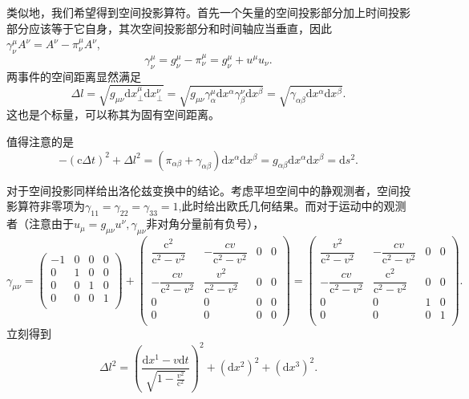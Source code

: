 \documentclass[11pt, a4paper, oneside, onecolumn]{ctexart}
\numberwithin{equation}{subsection}
\begin{document}
类似地，我们希望得到空间投影算符。首先一个矢量的空间投影部分加上时间投影部分应该等于它自身，其次空间投影部分和时间轴应当垂直，因此$\gamma^{\mu}_{\nu}A^{\nu}=A^{\nu}-\pi_{\nu}^{\mu}A^{\nu}$,
\begin{equation}
\gamma^{\mu}_{\nu}=g^{\mu}_{\nu}-\pi^{\mu}_{\nu}=g_{\nu}^{\mu}+u^{\mu}u_{\nu}.
\end{equation}
两事件的空间距离显然满足
\begin{equation}
\Delta{}l=\sqrt{g_{\mu\nu}\mathrm{d}x^{\mu}_{\bot}\mathrm{d}x^{\nu}_{\bot}}=\sqrt{g_{\mu\nu}\gamma^{\mu}_{\alpha}\mathrm{d}x^{\alpha}\gamma^{\nu}_{\beta}\mathrm{d}x^{\beta}}=\sqrt{\gamma_{\alpha\beta}\mathrm{d}x^{\alpha}\mathrm{d}x^{\beta}}.\label{2.1.11}
\end{equation}
这也是个标量，可以称其为固有空间距离。

值得注意的是
\begin{equation}
-\left(\mathrm{c}\Delta{}t\right)^{2}+\Delta{}l^{2}=\left(\pi_{\alpha\beta}+\gamma_{\alpha\beta}\right)\mathrm{d}x^{\alpha}\mathrm{d}x^{\beta}=g_{\alpha\beta}\mathrm{d}x^{\alpha}\mathrm{d}x^{\beta}=\mathrm{d}s^{2}.
\end{equation}

对于空间投影同样给出洛伦兹变换中的结论。考虑平坦空间中的静观测者，空间投影算符非零项为$\gamma_{11}=\gamma_{22}=\gamma_{33}=1$,此时给出欧氏几何结果。而对于运动中的观测者（注意由于$u_{\mu}=g_{\mu\nu}u^{\nu},\gamma_{\mu\nu}$非对角分量前有负号），
\begin{equation}
\gamma_{\mu\nu}=\begin{pmatrix}
-1 & 0 & 0 & 0\\
0 & 1 & 0 & 0\\
0 & 0 & 1 & 0\\
0 & 0 & 0 & 1\\
\end{pmatrix}+
\begin{pmatrix}
\dfrac{\mathrm{c}^{2}}{\mathrm{c}^{2}-v^{2}} & -\dfrac{cv}{\mathrm{c}^{2}-v^{2}} & 0 & 0\\
-\dfrac{cv}{\mathrm{c}^{2}-v^{2}} & \dfrac{v^{2}}{\mathrm{c}^{2}-v^{2}} & 0 & 0\\
0 & 0 & 0 & 0\\
0 & 0 & 0 & 0\\
\end{pmatrix}=
\begin{pmatrix}
\dfrac{v^{2}}{\mathrm{c}^{2}-v^{2}} & -\dfrac{cv}{\mathrm{c}^{2}-v^{2}} & 0 & 0\\
-\dfrac{cv}{\mathrm{c}^{2}-v^{2}} & \dfrac{\mathrm{c}^{2}}{\mathrm{c}^{2}-v^{2}} & 0 & 0\\
0 & 0 & 1 & 0\\
0 & 0 & 0 & 1\\
\end{pmatrix}.
\end{equation}
立刻得到
\begin{equation}
\Delta{}l^{2}=\left(\frac{\mathrm{d}x^{1}-v\mathrm{d}t}{\sqrt{1-\frac{v^{2}}{\mathrm{c}^{2}}}}\right)^{2}+\left(\mathrm{d}x^{2}\right)^{2}+\left(\mathrm{d}x^{3}\right)^{2}.
\end{equation}
\end{document}
